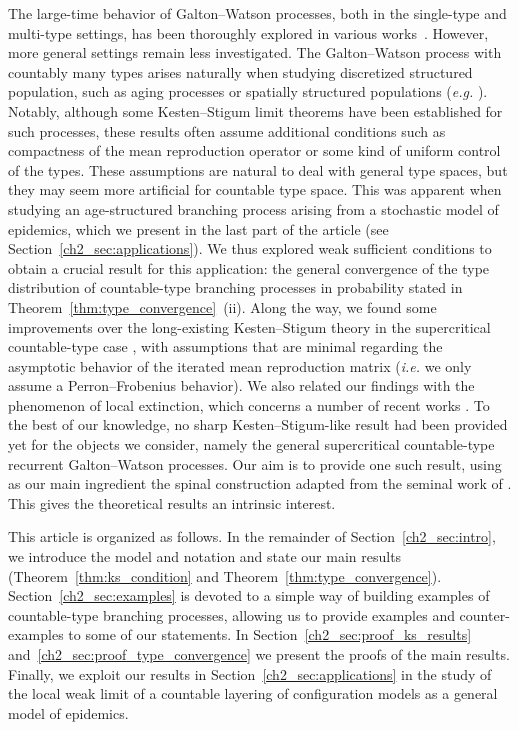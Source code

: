 \begin{refsegment}
The large-time behavior of Galton--Watson processes, both in the
single-type and multi-type settings, has been thoroughly explored in
various
works~\citep[\textit{e.g.}][]{harris_theory_1964,athreya_branching_1972}.
However, more general settings remain less investigated. The
Galton--Watson process with countably many types arises naturally when
studying discretized structured population, such as aging processes or
spatially structured populations (\textit{e.g.}
\citealt{bansaye_queueing_2018,ligonniere_kesten_2024,braunsteins_pathwise_2019}).
Notably, although some Kesten--Stigum limit theorems have been
established for such processes, these results often assume additional
conditions such as compactness of the mean reproduction operator or
some kind of uniform control of the types. These assumptions
  are natural to deal with general type spaces, but they may seem more
  artificial for countable type space. This was apparent when studying
  an age-structured branching process arising from a stochastic model
  of epidemics, which we present in the last part of the article (see
  Section~\ref{ch2_sec:applications}). We thus explored weak sufficient
  conditions to obtain a crucial result for this application: the
  general convergence of the type distribution of countable-type
  branching processes in probability stated in
  Theorem~\ref{thm:type_convergence}~(ii). Along the way, we found
  some improvements over the long-existing Kesten--Stigum theory in
  the supercritical countable-type case
  \citep{moy_extensions_1967,asmussen_strong_1976}, with assumptions
  that are minimal regarding the asymptotic behavior of the iterated
  mean reproduction matrix (\textit{i.e.} we only assume a Perron--Frobenius
  behavior). We also related our findings with the phenomenon of local
  extinction, which concerns a number of recent works
  \citep[\emph{e.g.}][]{braunsteins_pathwise_2019,ligonniere_kesten_2024}.
 To the best of our knowledge, no sharp Kesten--Stigum-like result
had been provided yet for the objects we consider, namely the general
supercritical countable-type recurrent Galton--Watson processes. Our
aim is to provide one such result, using as our main ingredient the
spinal construction adapted from the seminal work of
\citet{lyons_pemantle_peres_1995}. This gives the theoretical results
an intrinsic interest.

This article is organized as follows. In the remainder of
  Section~\ref{ch2_sec:intro}, we introduce the model and notation and
  state our main results (Theorem~\ref{thm:ks_condition} and
  Theorem~\ref{thm:type_convergence}). Section~\ref{ch2_sec:examples} is
  devoted to a simple way of building examples of countable-type
  branching processes, allowing us to provide examples and
  counter-examples to some of our statements. In
  Section~\ref{ch2_sec:proof_ks_results}
  and~\ref{ch2_sec:proof_type_convergence} we present the proofs of the
  main results. Finally, we exploit our results in
  Section~\ref{ch2_sec:applications} in the study of the local weak limit
  of a countable layering of configuration models as a general model
  of epidemics.


\end{refsegment}
